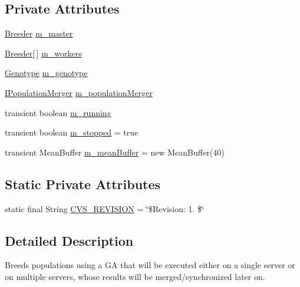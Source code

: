 \subsection*{Private Attributes}
\begin{DoxyCompactItemize}
\item 
\hyperlink{classorg_1_1jgap_1_1distr_1_1_breeder}{Breeder} \hyperlink{classorg_1_1jgap_1_1distr_1_1_breeder_a75f60c6d46054aa34fed05f6a6d6d058}{m\-\_\-master}
\item 
\hyperlink{classorg_1_1jgap_1_1distr_1_1_breeder}{Breeder}\mbox{[}$\,$\mbox{]} \hyperlink{classorg_1_1jgap_1_1distr_1_1_breeder_a336a3b9df78c37790c4742f7c4eeb456}{m\-\_\-workers}
\item 
\hyperlink{classorg_1_1jgap_1_1_genotype}{Genotype} \hyperlink{classorg_1_1jgap_1_1distr_1_1_breeder_a86129a6e573ed2ca9961931713250483}{m\-\_\-genotype}
\item 
\hyperlink{interfaceorg_1_1jgap_1_1distr_1_1_i_population_merger}{I\-Population\-Merger} \hyperlink{classorg_1_1jgap_1_1distr_1_1_breeder_a7ed056f076614c9e220460f107259c5a}{m\-\_\-population\-Merger}
\item 
transient boolean \hyperlink{classorg_1_1jgap_1_1distr_1_1_breeder_a91831c9376bf49003f0f162f1a75f8f2}{m\-\_\-running}
\item 
transient boolean \hyperlink{classorg_1_1jgap_1_1distr_1_1_breeder_a4ff067764f6ccbe3eb6c3db7ea542e63}{m\-\_\-stopped} = true
\item 
transient Mean\-Buffer \hyperlink{classorg_1_1jgap_1_1distr_1_1_breeder_afdbe7d0bf0133cb06ec341749d04eccf}{m\-\_\-mean\-Buffer} = new Mean\-Buffer(40)
\end{DoxyCompactItemize}
\subsection*{Static Private Attributes}
\begin{DoxyCompactItemize}
\item 
static final String \hyperlink{classorg_1_1jgap_1_1distr_1_1_breeder_a33945fdaddc67a98814f59c61ce919bf}{C\-V\-S\-\_\-\-R\-E\-V\-I\-S\-I\-O\-N} = \char`\"{}\$Revision\-: 1. \$\char`\"{}
\end{DoxyCompactItemize}


\subsection{Detailed Description}
Breeds populations using a G\-A that will be executed either on a single server or on multiple servers, whose results will be merged/synchronized later on. 

